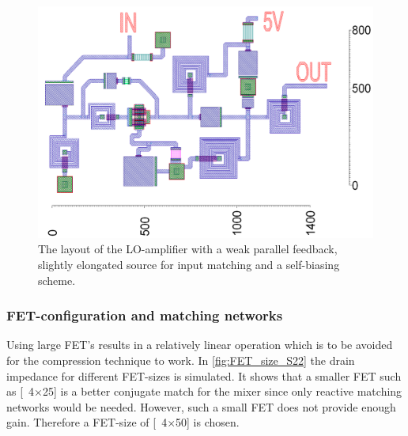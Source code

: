 			\begin{figure}[hbt!]
				\centering
				\includegraphics[width=1.0\textwidth]{fig/amplifiers/lo/layout}
				\caption[LO-amplifier layout]{The layout of the LO-amplifier with a weak parallel feedback, slightly elongated source for input matching and a self-biasing scheme.\scalemum}\label{fig:lo_layout}
			\end{figure}
			


		\subsubsection{FET-configuration and matching networks}\label{sec:lo_fet_config}
			Using large FET's results in a relatively linear operation which is to be avoided for the compression technique to work.\autocite{maas98} %
In \autoref{fig:FET_size_S22} the drain impedance for different FET-sizes is simulated. It shows that a smaller FET such as \unit[4$\times$25]{\mum} is a better conjugate match for the mixer since only reactive matching networks would be needed. However, such a small FET does not provide enough gain. Therefore a FET-size of \unit[4$\times$50]{\mum} is chosen. 

